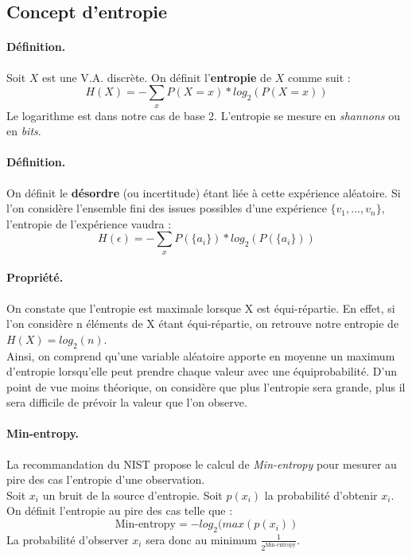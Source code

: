 \subsection{Concept d'entropie}
\paragraph{Définition.\\}
Soit $X$ est une V.A. discrète. On définit l'\textbf{entropie} de $X$ comme suit : 
$$H(X) = - \sum_x P(X=x)*log_2(P(X=x))	 $$ 
Le logarithme est dans notre cas de base 2. L'entropie se mesure en \textit{shannons} ou en \textit{bits}.\\

\paragraph{Définition.\\}
On définit le \textbf{désordre} (ou incertitude) étant liée à cette expérience aléatoire. Si l'on considère l'ensemble fini des issues possibles d'une expérience $\lbrace v_1,...,v_n \rbrace$, l'entropie de l'expérience vaudra :
$$H(\epsilon) = - \sum_x P(\lbrace a_i \rbrace)*log_2(P(\lbrace a_i \rbrace))	 $$ 

\paragraph{Propriété.\\} 
On constate que l'entropie est maximale lorsque X est équi-répartie. En effet, si l'on considère n éléments de X étant équi-répartie, on retrouve notre entropie de $H(X) = log_2(n)$. \\


Ainsi, on comprend qu'une variable aléatoire apporte en moyenne un maximum d'entropie lorsqu'elle peut prendre chaque valeur avec une équiprobabilité. D'un point de vue moins théorique, on considère que plus l'entropie sera grande, plus il sera difficile de prévoir la valeur que l'on observe.

\paragraph{Min-entropy.\\}
La recommandation du NIST propose le calcul de \textit{Min-entropy} pour mesurer au pire des cas l'entropie d'une observation. \\

Soit $x_i$ un bruit de la source d'entropie. Soit $p(x_i)$ la probabilité d'obtenir $x_i$. On définit l'entropie au pire des cas telle que : 
$$\text{Min-entropy}=-log_2(max(p(x_i))$$
La probabilité d'observer $x_i$ sera donc au minimum $\frac{1}{2^\text{Min-entropy}}$.

